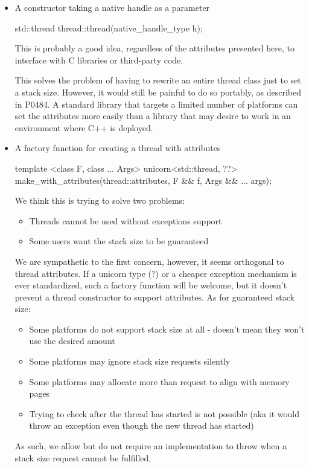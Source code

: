 \documentclass{wg21}
\begin{document}
\begin{itemize}
\item  A constructor taking a native handle as a parameter
\begin{codeblock}
std::thread thread::thread(native_handle_type h);
\end{codeblock}

This is probably a good idea, regardless of the attributes presented here,
to interface with C libraries or third-party code.

This solves the problem of having to rewrite an entire thread class just to set a stack size.
However, it would still be painful to do so portably, as described in P0484.
A standard library that targets a limited number of platforms can set the attributes more easily than a library that may desire to work in an environment where C++ is deployed.


\item A factory function for creating a thread with attributes
\begin{codeblock}
template <class F, class ... Args>
unicorn<std::thread, ??> make_with_attributes(thread::attributes, F && f, Args && ... args);
\end{codeblock}

We think this is trying to solve two problems:

\begin{itemize}
\item  Threads cannot be used without exceptions support
\item  Some users want the stack size to be guaranteed
\end{itemize}

We are sympathetic to the first concern, however, it seems orthogonal to thread attributes.
If a unicorn type (?) or a cheaper exception mechanism is ever standardized,
such a factory function will be welcome, but it doesn't prevent a thread constructor to support attributes.
As for guaranteed stack size:

\begin{itemize}
\item  Some platforms do not support stack size at all - doesn't mean they won't use the desired amount
\item  Some platforms may ignore stack size requests silently
\item  Some platforms may allocate more than request to align with memory pages
\item  Trying to check after the thread has started is not possible (aka it would throw an exception even though the new thread has started)
\end{itemize}

As such, we allow but do not require an implementation to throw when a stack size request cannot be fulfilled.
\end{itemize}
\end{document}
